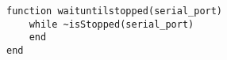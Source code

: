 \begin{lstlisting}
function waituntilstopped(serial_port)
    while ~isStopped(serial_port)
    end
end

\end{lstlisting}